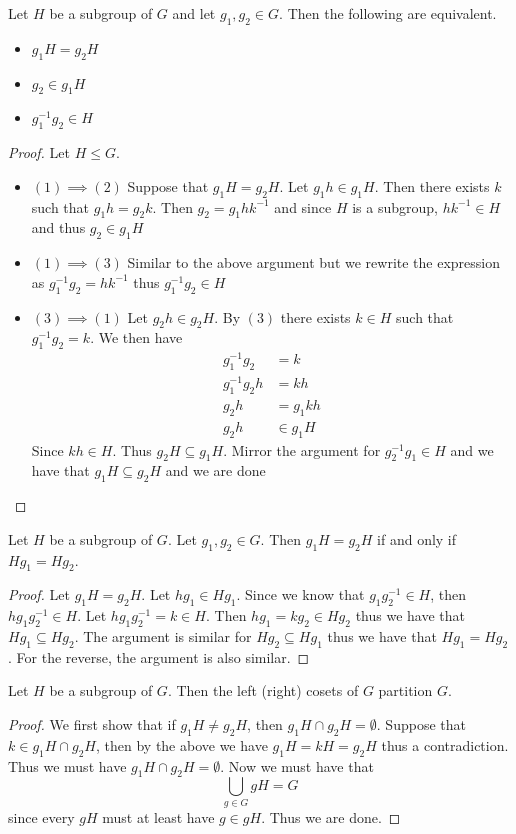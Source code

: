 \documentclass[a4paper]{article}
\begin{document}
\begin{prp}{}{} Let $H$ be a subgroup of $G$ and let $g_1,g_2\in G$. Then the following are equivalent. 
\begin{itemize}
\item $g_1H=g_2H$
\item $g_2\in g_1H$
\item $g_1^{-1}g_2\in H$
\end{itemize}\tcbline
\begin{proof} Let $H\leq G$. 
\begin{itemize}
\item $(1)\implies(2)$ Suppose that $g_1H=g_2H$. Let $g_1h\in g_1H$. Then there exists $k$ such that $g_1h=g_2k$. Then $g_2=g_1hk^{-1}$ and since $H$ is a subgroup, $hk^{-1}\in H$ and thus $g_2\in g_1H$
\item $(1)\implies(3)$ Similar to the above argument but we rewrite the expression as $g_1^{-1}g_2=hk^{-1}$ thus $g_1^{-1}g_2\in H$
\item $(3)\implies(1)$ Let $g_2h\in g_2H$. By $(3)$ there exists $k\in H$ such that $g_1^{-1}g_2=k$. We then have 
\begin{align*}
g_1^{-1}g_2&=k\\
g_1^{-1}g_2h&=kh\\
g_2h&=g_1kh\\
g_2h&\in g_1H
\end{align*} Since $kh\in H$. Thus $g_2H\subseteq g_1H$. Mirror the argument for $g_2^{-1}g_1\in H$ and we have that $g_1H\subseteq g_2H$ and we are done
\end{itemize}
\end{proof}
\end{prp}

\begin{prp}{}{} Let $H$ be a subgroup of $G$. Let $g_1,g_2\in G$. Then $g_1H=g_2H$ if and only if $Hg_1=Hg_2$. \tcbline
\begin{proof} Let $g_1H=g_2H$. Let $hg_1\in Hg_1$. Since we know that $g_1g_2^{-1}\in H$, then $hg_1g_2^{-1}\in H$. Let $hg_1g_2^{-1}=k\in H$. Then $hg_1=kg_2\in Hg_2$ thus we have that $Hg_1\subseteq Hg_2$. The argument is similar for $Hg_2\subseteq Hg_1$ thus we have that $Hg_1=Hg_2$. For the reverse, the argument is also similar. 
\end{proof}
\end{prp}

\begin{prp}{}{} Let $H$ be a subgroup of $G$. Then the left (right) cosets of $G$ partition $G$. \tcbline
\begin{proof} We first show that if $g_1H\neq g_2H$, then $g_1H\cap g_2H=\emptyset$. Suppose that $k\in g_1H\cap g_2H$, then by the above we have $g_1H=kH=g_2H$ thus a contradiction. Thus we must have $g_1H\cap g_2H=\emptyset$. Now we must have that $$\bigcup_{g\in G}gH=G$$ since every $gH$ must at least have $g\in gH$. Thus   we are done. 
\end{proof}
\end{prp}
\end{document}
